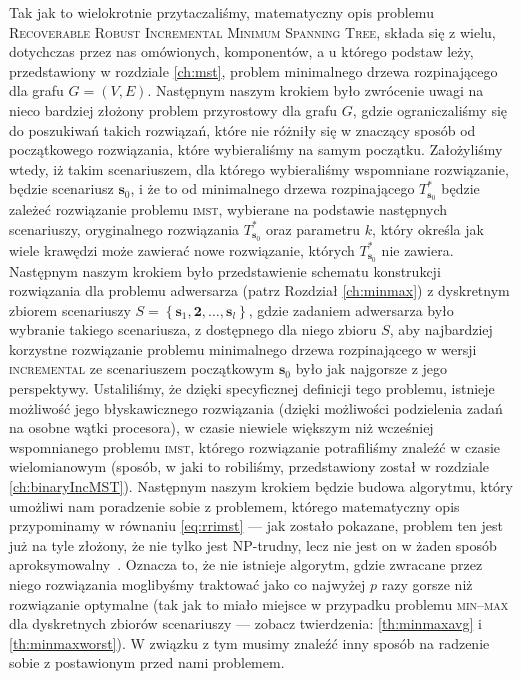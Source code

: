 Tak jak to wielokrotnie przytaczaliśmy, matematyczny opis problemu \textsc{Recoverable Robust Incremental Minimum Spanning Tree}, składa się z wielu, dotychczas przez nas omówionych, komponentów, a u którego podstaw leży, przedstawiony w rozdziale \ref{ch:mst}, problem minimalnego drzewa rozpinającego dla grafu $G = \left( V, E \right)$. Następnym naszym krokiem było zwrócenie uwagi na nieco bardziej złożony problem przyrostowy dla grafu $G$, gdzie ograniczaliśmy się do poszukiwań takich rozwiązań, które nie różniły się w znaczący sposób od początkowego rozwiązania, które wybieraliśmy na samym początku. Założyliśmy wtedy, iż takim scenariuszem, dla którego wybieraliśmy wspomniane rozwiązanie, będzie scenariusz $\textbf{s}_{0}$, i że to od minimalnego drzewa rozpinającego $T^{\ast}_{\textbf{s}_{0}}$ będzie zależeć rozwiązanie problemu \textsc{imst}, wybierane na podstawie następnych scenariuszy, oryginalnego rozwiązania $T^{\ast}_{\textbf{s}_{0}}$ oraz parametru $k$, który określa jak wiele krawędzi może zawierać nowe rozwiązanie, których $T^{\ast}_{\textbf{s}_{0}}$ nie zawiera. Następnym naszym krokiem było przedstawienie schematu konstrukcji rozwiązania dla problemu adwersarza (patrz Rozdział \ref{ch:minmax}) z dyskretnym zbiorem scenariuszy $S = \left\{ \textbf{s}_{1}, \textbf{2}, \dots, \textbf{s}_{l} \right\}$, gdzie zadaniem adwersarza było wybranie takiego scenariusza, z dostępnego dla niego zbioru $S$, aby najbardziej korzystne rozwiązanie problemu minimalnego drzewa rozpinającego w wersji \textsc{incremental} ze scenariuszem początkowym $\textbf{s}_{0}$ było jak najgorsze z jego perspektywy. Ustaliliśmy, że dzięki specyficznej definicji tego problemu, istnieje możliwość jego błyskawicznego rozwiązania (dzięki możliwości podzielenia zadań na osobne wątki procesora), w czasie niewiele większym niż wcześniej wspomnianego problemu \textsc{imst}, którego rozwiązanie potrafiliśmy znaleźć w czasie wielomianowym (sposób, w jaki to robiliśmy, przedstawiony został w rozdziale \ref{ch:binaryIncMST}). Następnym naszym krokiem będzie budowa algorytmu, który umożliwi nam poradzenie sobie z problemem, którego matematyczny opis przypominamy w równaniu \ref{eq:rrimst} --- jak zostało pokazane, problem ten jest już na tyle złożony, że nie tylko jest \textsc{NP}-trudny, lecz nie jest on w żaden sposób aproksymowalny~\cite[$6$]{Kasperski2014}. Oznacza to, że nie istnieje algorytm, gdzie zwracane przez niego rozwiązania moglibyśmy traktować jako co najwyżej $p$ razy gorsze niż rozwiązanie optymalne (tak jak to miało miejsce w przypadku problemu \textsc{min--max} dla dyskretnych zbiorów scenariuszy --- zobacz twierdzenia: \ref{th:minmaxavg} i \ref{th:minmaxworst}). W związku z tym musimy znaleźć inny sposób na radzenie sobie z postawionym przed nami problemem.

